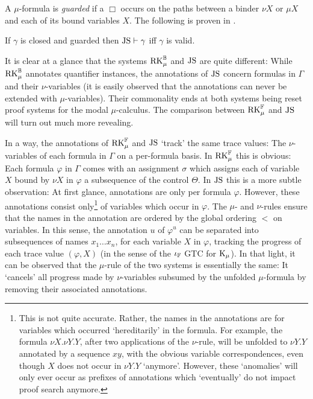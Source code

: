 A $\mu$-formula is \emph{guarded} if a $\Box$ occurs on the paths between a
binder $\nu X$ or $\mu X$ and each of its bound variables $X$. The following is
proven in \parencite[Theorem 4]{stirlingProofSystemNames2013}.

\begin{proposition}
  If $\gamma$ is closed and guarded then $\mathrm{JS} \vdash \gamma$ iff $\gamma$ is valid.
\end{proposition}

It is clear at a glance that the systems $\mathrm{RK}_\mu^{\mathbb{B}}$ and $\mathrm{JS}$ are quite
different: While $\mathrm{RK}_\mu^{\mathbb{B}}$ annotates quantifier instances, the annotations of
$\mathrm{JS}$ concern formulas in $\Gamma$ and their $\nu$-variables (it is easily
observed that the annotations can never be extended with $\mu$-variables). Their
commonality ends at both systems being reset proof systems for the modal
$\mu$-calculus. The 
comparison between $\mathrm{RK}_\mu^{\mathbb{F}}$ and $\mathrm{JS}$ will turn out much more revealing.

In a way, the annotations of $\mathrm{RK}_\mu^{\mathbb{F}}$ and $\mathrm{JS}$ `track' the same trace
values: The $\nu$-variables of each formula in $\Gamma$ on a per-formula basis.
In $\mathrm{RK}_\mu^{\mathbb{F}}$ this is obvious: Each formula $\varphi$ in $\Gamma$ comes with an assignment
$\sigma$ which assigns each of variable $X$ bound by $\nu X$ in $\varphi$ a
subsequence of the control $\Theta$. In $\mathrm{JS}$ this is a more subtle observation:
At first glance, annotations are only per formula $\varphi$. However, these annotations
consist only\footnote{This is not quite accurate. Rather, the names in the
  annotations are for variables which occurred `hereditarily' in the formula.
  For example, the formula $\nu X. \nu Y. Y$, after two applications of the
  $\nu$-rule, will be unfolded to $\nu Y. Y$ annotated by a sequence $xy$, with the obvious variable
  correspondences, even though $X$ does not occur in $\nu Y. Y$ `anymore'.
  However, these `anomalies' will only ever occur as prefixes of annotations
  which `eventually' do not impact proof search anymore.} of variables which
occur in $\varphi$. The $\mu$- and $\nu$-rules ensure that the names in the
annotation are ordered by the global ordering $<$ on variables. In this sense,
the annotation $u$ of $\varphi^u$ can be separated into subsequences of names
$x_1 \ldots x_n$, for each variable $X$ in $\varphi$, tracking the progress  of
each trace value $(\varphi, X)$ (in the sense of the $\iota_{\mathbb{F}}$ GTC for
$\mathrm{K}_\mu$).
In that light, it can be observed that the $\mu$-rule of the two
systems is essentially the same: It `cancels' all progress made by
$\nu$-variables subsumed by the unfolded $\mu$-formula by removing their
associated annotations.

